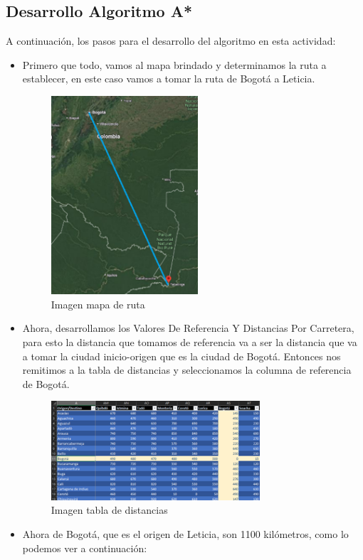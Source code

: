 \documentclass[conference]{IEEEtran}
\begin{document}
	\subsection{Desarrollo Algoritmo A*}
	A continuación, los pasos para el desarrollo del algoritmo en esta actividad:
	\begin{itemize}
	\item Primero que todo, vamos al mapa brindado y determinamos la ruta a establecer, en este caso vamos a tomar la ruta de Bogotá a Leticia.
		\begin{figure}[ht!] %
			\centering
			\includegraphics[width=2.15in]{Imagen1.png}
			\caption{Imagen mapa de ruta}
			\label{picture}
		\end{figure}
	\item Ahora, desarrollamos los Valores De Referencia Y Distancias Por Carretera, para esto la distancia que tomamos de referencia va a ser la distancia que va a tomar la ciudad inicio-origen que es la ciudad de Bogotá. Entonces nos remitimos a la tabla de distancias y seleccionamos la columna de referencia de Bogotá.
		\begin{figure}[ht!] %
			\centering
			\includegraphics[width=3.05in]{Imagen2.png}
			\caption{Imagen tabla de distancias}
			\label{picture}
		\end{figure}
	\item Ahora de Bogotá, que es el origen de Leticia, son 1100 kilómetros, como lo podemos ver a continuación:

\end{itemize}
\end{document}

